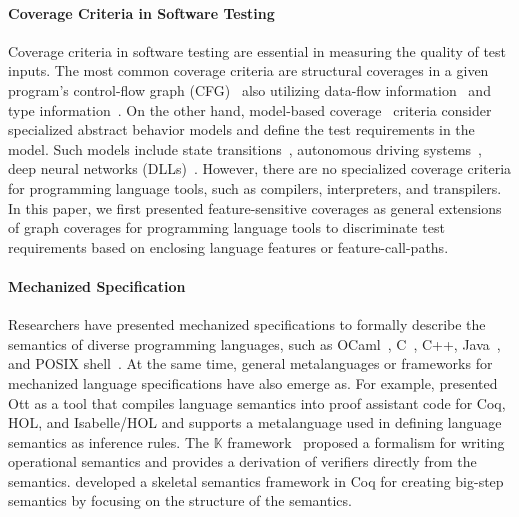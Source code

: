\documentclass[acmsmall,review,screen]{acmart}
\newcommand{\kframework}{\mathbb{K}}
\begin{document}
\paragraph{\textbf{Coverage Criteria in Software Testing}}
Coverage criteria in software testing are essential in measuring the quality of test inputs.
The most common coverage criteria are structural coverages in a given program's
control-flow graph (CFG)~\cite{cov-mcdc,cov-def} also utilizing
data-flow information~\cite{cov-dataflow} and type information~\cite{cov-partition}.
On the other hand, model-based coverage~\cite{cov-model-book} criteria consider
specialized abstract behavior models and define the test requirements in the model.
Such models include state transitions~\cite{cov-model-api},
autonomous driving systems~\cite{cov-param},
deep neural networks (DLLs)~\cite{cov-neuron,cov-k-neuron,cov-concolic-dll,
cov-fuzz-tensor, cov-fuzz-dl}.
However, there are no specialized coverage criteria for programming language
tools, such as compilers, interpreters, and transpilers.
In this paper, we first presented feature-sensitive coverages as general
extensions of graph coverages for programming language tools to discriminate
test requirements based on enclosing language features or feature-call-paths.


\paragraph{\textbf{Mechanized Specification}}

Researchers have presented mechanized specifications to formally describe the
semantics of diverse programming languages, such as
OCaml~\cite{ocaml-light-spec}, C~\cite{c-light-spec}, C++\cite{cpp-spec},
Java~\cite{k-java}, and POSIX shell~\cite{posix-shell-spec}.
%
At the same time, general metalanguages or frameworks for mechanized language
specifications have also emerge as.
%
For example, \citet{ott} presented Ott as a tool that compiles language
semantics into proof assistant code for Coq, HOL, and Isabelle/HOL and supports
a metalanguage used in defining language semantics as inference rules.
%
The $\kframework$ framework~\cite{kframework} proposed a formalism for writing
operational semantics and provides a derivation of verifiers directly from the
semantics.
%
\citet{skel} developed a skeletal semantics framework in Coq for creating
big-step semantics by focusing on the structure of the semantics.
\end{document}
